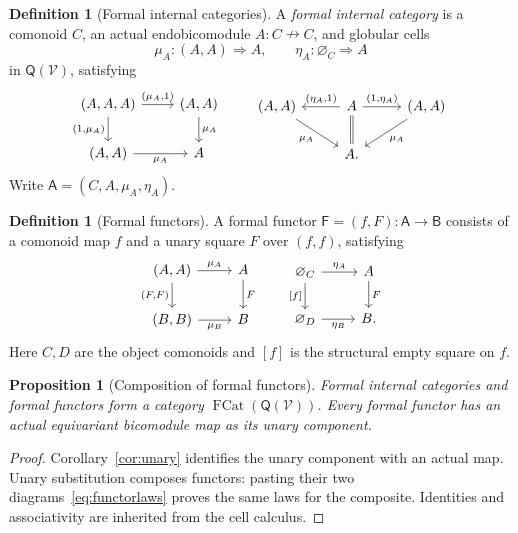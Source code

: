 \documentclass[11pt,a4paper]{article}
\newtheorem{proposition}[theorem]{Proposition}
\theoremstyle{definition}
\newtheorem{definition}[theorem]{Definition}
\theoremstyle{remark}
\numberwithin{equation}{section}
\newcommand{\V}{\mathcal V}
\newcommand{\Q}{\mathsf Q}
\newcommand{\harr}{\mathrel{\nrightarrow}}
\newcommand{\cell}{\mathrel{\Longrightarrow}}
\newcommand{\emp}[1]{\varnothing_{#1}}
\newcommand{\FCat}{\operatorname{FCat}}
\begin{document}
\begin{definition}[Formal internal categories]\label{def:category}
A \emph{formal internal category} is a comonoid $C$, an actual
endobicomodule $A:C\harr C$, and globular cells
\[
\mu_A:(A,A)\cell A,\qquad \eta_A:\emp C\cell A
\]
in $\Q(\V)$, satisfying
\begin{equation}\label{eq:monadlaws}
\begin{tikzcd}[column sep=2.3em]
(A,A,A) \arrow[r,"{(\mu_A,1)}"] \arrow[d,"{(1,\mu_A)}"'] &
(A,A) \arrow[d,"\mu_A"]\\
(A,A) \arrow[r,"\mu_A"'] & A
\end{tikzcd}
\qquad
\begin{tikzcd}[column sep=2.6em]
(A,A) \arrow[dr,"\mu_A"'] &
A \arrow[l,"{(\eta_A,1)}"'] \arrow[r,"{(1,\eta_A)}"]
  \arrow[d,equal] &
(A,A) \arrow[dl,"\mu_A"]\\
& A. &
\end{tikzcd}
\end{equation}
Write $\mathsf A=(C,A,\mu_A,\eta_A)$.
\end{definition}

\begin{definition}[Formal functors]\label{def:functor}
A formal functor
$\mathsf F=(f,F):\mathsf A\to\mathsf B$ consists of a comonoid map $f$
and a unary square $F$ over $(f,f)$, satisfying
\begin{equation}\label{eq:functorlaws}
\begin{tikzcd}
(A,A) \arrow[r,"\mu_A"] \arrow[d,"{(F,F)}"'] &
A \arrow[d,"F"]\\
(B,B) \arrow[r,"\mu_B"'] & B
\end{tikzcd}
\qquad
\begin{tikzcd}
\emp C \arrow[r,"\eta_A"] \arrow[d,"{[f]}"'] &
A \arrow[d,"F"]\\
\emp D \arrow[r,"\eta_B"'] & B.
\end{tikzcd}
\end{equation}
Here $C,D$ are the object comonoids and $[f]$ is the structural empty
square on $f$.
\end{definition}

\begin{proposition}[Composition of formal functors]\label{prop:functor-category}
Formal internal categories and formal functors form a category
$\FCat(\Q(\V))$. Every formal functor has an actual equivariant
bicomodule map as its unary component.
\end{proposition}
\begin{proof}
Corollary~\ref{cor:unary} identifies the unary component with an actual
map. Unary substitution composes functors: pasting their two
diagrams~\eqref{eq:functorlaws} proves the same laws for the composite.
Identities and associativity are inherited from the cell calculus.
\end{proof}
\end{document}

